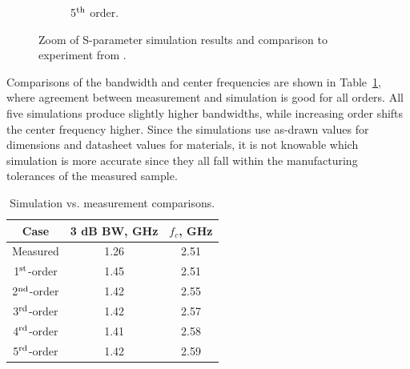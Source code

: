\documentclass[titlepage]{article}
\renewcommand\_{\textunderscore\linebreak[1]}
\begin{document}
\begin{figure}[p]
\begin{subfigure}{0.72\textwidth}
     \caption{5$^{\textnormal{th}}$ order.}
  \end{subfigure}
  \caption{Zoom of S-parameter simulation results and comparison to experiment from \cite{Weng}.}
  \label{fig:filter_results_zoom}
\end{figure}

Comparisons of the bandwidth and center frequencies are shown in Table~\ref{table:microstrip_filter_comparisons}, where agreement between measurement and simulation is good for all orders.  All five simulations produce slightly higher bandwidths, while increasing order shifts the center frequency higher.  Since the simulations use as-drawn values for dimensions and datasheet values for materials, it is not knowable which simulation is more accurate since they all fall within the manufacturing tolerances of the measured sample.
\begin{table}
\caption{Simulation vs. measurement comparisons.}
\begin{center}
\begin{tabular}{|c|c|c|}
\hline
Case & 3 dB BW, GHz & $f_c$, GHz \\
\hline
Measured \cite{Weng} & 1.26 & 2.51 \\
1$^{\textnormal{st}}$-order & 1.45 & 2.51 \\
2$^{\textnormal{nd}}$-order & 1.42 & 2.55 \\
3$^{\textnormal{rd}}$-order & 1.42 & 2.57 \\
4$^{\textnormal{rd}}$-order & 1.41 & 2.58 \\
5$^{\textnormal{rd}}$-order & 1.42 & 2.59 \\
\hline
\end{tabular}
\end{center}
\label{table:microstrip_filter_comparisons}
\end{table}
\end{document}
